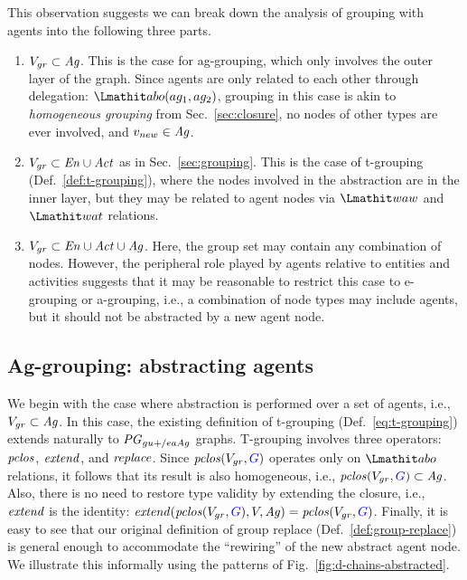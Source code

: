 This observation suggests we can break down the analysis of grouping with agents into the following three parts.
%
\begin{enumerate}
\item $V_{gr} \subset \mathit{Ag}$. This is the case for ag-grouping, which only involves the outer layer of the graph. Since agents are only related to each other through delegation: $\delegate(ag_1 , ag_2)$, grouping in this case is akin to \textit{homogeneous grouping} from Sec.~\ref{sec:closure},  no nodes of other types are ever involved, and $v_{new} \in \mathit{Ag}$. %

\item $V_{gr} \subset \mathit{En} \cup \mathit{Act}$ as in Sec.~\ref{sec:grouping}. This is the case of t-grouping (Def.~\ref{def:t-grouping}), where the nodes involved in the abstraction are in the inner layer, but they may be related to agent nodes via $\waw$ and $\wat$ relations.

\item $V_{gr} \subset \mathit{En} \cup \mathit{Act} \cup \mathit{Ag}$.  Here, the group set may contain any combination of nodes. However, the peripheral role played by agents relative to entities and activities suggests that it may be reasonable to restrict this case to e-grouping or a-grouping, i.e., a combination of node types may include agents, but it should not be abstracted by a new agent node.
%
\end{enumerate}



\subsection{Ag-grouping: abstracting agents}  \label{sec:ag-grouping}

We begin with the case where abstraction is performed over a set of agents, i.e., $V_{gr} \subset \mathit{Ag}$.
%
In this case, the existing definition of t-grouping (Def.~\ref{eq:t-grouping}) extends naturally to $\mathit{PG}_{gu+/eaAg}$ graphs.
%
%
T-grouping involves three operators: $\mathit{pclos}$, $\mathit{extend}$, and $\mathit{replace}$.
%
Since $\clos(V_{gr}, \jwb{G})$ operates only on $\delegate$ relations, it follows that its result is also homogeneous, i.e., $\clos(V_{gr}, \jwb{G}) \subset \ag$. Also, there is no need to restore type validity by extending the closure, i.e., $\mathit{extend}$ is the identity: $\extend(\clos(V_{gr},  \jwb{G}), V, \ag) = \clos(V_{gr},  \jwb{G})$.
%
Finally, it is easy to see that our original definition of group replace (Def.~\ref{def:group-replace}) is general enough to accommodate the ``rewiring'' of the new abstract agent node. 
%
We illustrate this informally using the patterns of Fig.~\ref{fig:d-chains-abstracted}.
%

